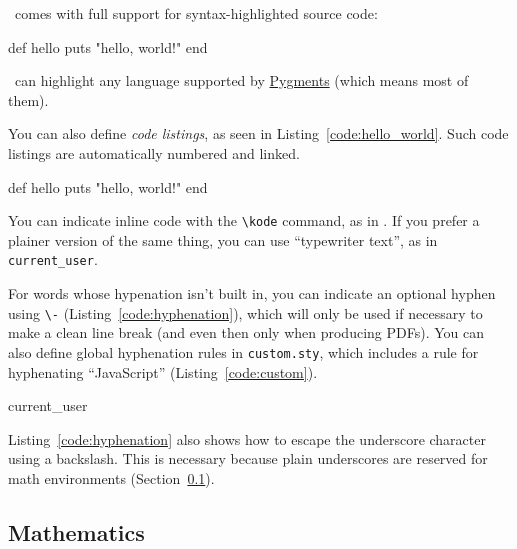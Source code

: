 \PolyTeXnic\ comes with full support for syntax-highlighted source code:
\begin{code}
def hello
  puts "hello, world!"
end
\end{code}
\noindent \PolyTeXnic\ can highlight any language supported by \href{http://pygments.org/languages/}{Pygments} (which means most of them).

You can also define \emph{code listings}, as seen in Listing~\ref{code:hello_world}. Such code listings are automatically numbered and linked.

\begin{codelisting}
\label{code:hello_world}
\begin{code}
def hello
  puts "hello, world!"
end
\end{code}
\end{codelisting}

You can indicate inline code with the \verb+\kode+ command, as in . If you prefer a plainer version of the same thing, you can use ``typewriter text'', as in \texttt{current\_\-user}.

For words whose hypenation isn't built in, you can indicate an optional hyphen using \verb+\-+ (Listing~\ref{code:hyphenation}), which will only be used if necessary to make a clean line break (and even then only when producing PDFs). You can also define global hyphenation rules in \texttt{custom.sty}, which includes a rule for hyphenating ``JavaScript'' (Listing~\ref{code:custom}).

\begin{codelisting}
\label{code:hyphenation}
\begin{code}
current\_\-user
\end{code}
\end{codelisting}

\begin{codelisting}
\label{code:custom}
\end{codelisting}

Listing~\ref{code:hyphenation} also shows how to escape the underscore character using a backslash. This is necessary because plain underscores are reserved for math environments (Section~\ref{sec:mathematics}).

\subsection{Mathematics}
\label{sec:mathematics}

